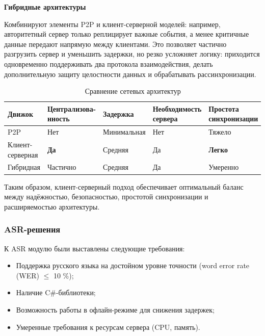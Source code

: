         \textbf{Гибридные архитектуры}

        Комбинируют элементы P2P и клиент-серверной моделей: например, авторитетный сервер только реплицирует важные события, а менее критичные данные 
        передают напрямую между клиентами. Это позволяет частично разгрузить сервер и уменьшить задержки, но резко усложняет логику: приходится одновременно поддерживать два протокола 
        взаимодействия, делать дополнительную защиту целостности данных и обрабатывать рассинхронизации.

        \begin{table}[ht]
            \caption{Сравнение сетевых архитектур}
            \centering
            \begingroup
            \fontsize{12}{14}\selectfont
            \renewcommand{\arraystretch}{1.2}
            \renewcommand{\tablename}{Табл.}
            \begin{tabularx}{\textwidth}{|X|X|X|X|X|}
            \hline
            \textbf{Движок}&\textbf{Централизова-нность} & \textbf{Задержка} & \textbf{Необходимость сервера}&\textbf{Простота синхронизации}\\
            \hline
            P2P&Нет&Минимальная&Нет&Тяжело\\
            \hline
            Клиент-серверная&\textbf{Да}&Средняя&Да&\textbf{Легко}\\
            \hline
            Гибридная&Частично&Средняя&Да&Умеренно\\
            \hline
            \end{tabularx}
            \endgroup
        \end{table}
        
        Таким образом, клиент-серверный подход обеспечивает оптимальный баланс между надёжностью, безопасностью, простотой синхронизации и расширяемостью архитектуры.

        \subsubsection{ASR-решения}

        К ASR модулю были выставлены следующие требования:
        \begin{itemize}
            \item Поддержка русского языка на достойном уровне точности (word error rate (WER) $\leq$ 10 \%);
            \item Наличие C\#-библиотеки;
            \item Возможность работы в офлайн-режиме для снижения задержек;
            \item Умеренные требования к ресурсам сервера (CPU, память).
        \end{itemize}

